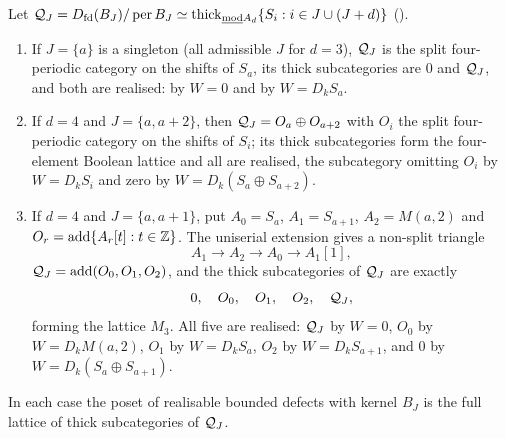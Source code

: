 \begin{proposition}\label{prop:m3}
Let \(\mathcal Q_J=D_{\mathrm{fd}}(B_J)/\operatorname{per} B_J\simeq\operatorname{thick}_{\underline{\operatorname{mod}}A_d}\{S_i:i\in J\cup(J+d)\}\) \textup{()}.
\begin{enumerate}[label=\textup{(\roman*)}]
\item\label{m3:single} If \(J=\{a\}\) is a singleton (all admissible \(J\) for \(d=3\)), \(\mathcal Q_J\) is the split four-periodic category on the shifts of \(S_a\), its thick subcategories are \(0\) and \(\mathcal Q_J\), and both are realised: by \(W=0\) and by \(W=D_kS_a\).
\item\label{m3:opposite} If \(d=4\) and \(J=\{a,a+2\}\), then \(\mathcal Q_J=O_a\oplus O_{a+2}\) with \(O_i\) the split four-periodic category on the shifts of \(S_i\); its thick subcategories form the four-element Boolean lattice and all are realised, the subcategory omitting \(O_i\) by \(W=D_kS_i\) and zero by \(W=D_k(S_a\oplus S_{a+2})\).
\item\label{m3:adjacent} If \(d=4\) and \(J=\{a,a+1\}\), put \(A_0=S_a\), \(A_1=S_{a+1}\), \(A_2=M(a,2)\) and \(O_r=\operatorname{add}\{A_r[t]:t\in\mathbb Z\}\).  The uniserial extension gives a non-split triangle
\begin{equation}\label{eq:m3-triangle}
 A_1\longrightarrow A_2\longrightarrow A_0\longrightarrow A_1[1],
\end{equation}
\(\mathcal Q_J=\operatorname{add}(O_0,O_1,O_2)\), and the thick subcategories of \(\mathcal Q_J\) are exactly
\[
 0,\quad O_0,\quad O_1,\quad O_2,\quad\mathcal Q_J,
\]
forming the lattice \(M_3\).  All five are realised: \(\mathcal Q_J\) by \(W=0\), \(O_0\) by \(W=D_kM(a,2)\), \(O_1\) by \(W=D_kS_a\), \(O_2\) by \(W=D_kS_{a+1}\), and \(0\) by \(W=D_k(S_a\oplus S_{a+1})\).
\end{enumerate}
In each case the poset of realisable bounded defects with kernel \(B_J\) is the full lattice of thick subcategories of \(\mathcal Q_J\).
\end{proposition}

